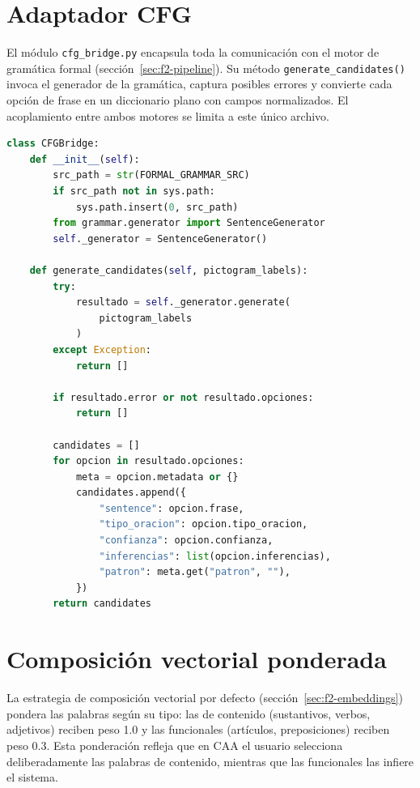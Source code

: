 \section{Adaptador CFG}

El módulo \texttt{cfg\_bridge.py} encapsula toda la comunicación con el motor de gramática formal (sección~\ref{sec:f2-pipeline}). Su método \texttt{generate\_candidates()} invoca el generador de la gramática, captura posibles errores y convierte cada opción de frase en un diccionario plano con campos normalizados. El acoplamiento entre ambos motores se limita a este único archivo.

\begin{lstlisting}[language=Python,caption={Adaptador al motor de gramática (\texttt{cfg\_bridge.py}).},label={lst:cfg-bridge},basicstyle=\ttfamily\small,xleftmargin=1cm]
class CFGBridge:
    def __init__(self):
        src_path = str(FORMAL_GRAMMAR_SRC)
        if src_path not in sys.path:
            sys.path.insert(0, src_path)
        from grammar.generator import SentenceGenerator
        self._generator = SentenceGenerator()

    def generate_candidates(self, pictogram_labels):
        try:
            resultado = self._generator.generate(
                pictogram_labels
            )
        except Exception:
            return []

        if resultado.error or not resultado.opciones:
            return []

        candidates = []
        for opcion in resultado.opciones:
            meta = opcion.metadata or {}
            candidates.append({
                "sentence": opcion.frase,
                "tipo_oracion": opcion.tipo_oracion,
                "confianza": opcion.confianza,
                "inferencias": list(opcion.inferencias),
                "patron": meta.get("patron", ""),
            })
        return candidates
\end{lstlisting}

\section{Composición vectorial ponderada}

La estrategia de composición vectorial por defecto (sección~\ref{sec:f2-embeddings}) pondera las palabras según su tipo: las de contenido (sustantivos, verbos, adjetivos) reciben peso 1.0 y las funcionales (artículos, preposiciones) reciben peso 0.3. Esta ponderación refleja que en CAA el usuario selecciona deliberadamente las palabras de contenido, mientras que las funcionales las infiere el sistema.

